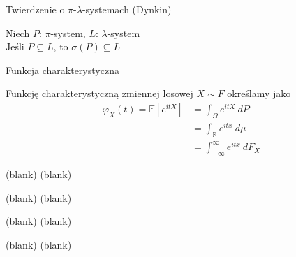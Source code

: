 \documentclass[avery5371,grid,frame]{flashcards}
\begin{document}
\begin{flashcard}[Twierdzenie]{Twierdzenie o $\pi$-$\lambda$-systemach (Dynkin)}

\smallskip
Niech $\mathit{P}$: $\pi$-system, $\mathit{L}$: $\lambda$-system \\
Jeśli $\mathit{P} \subseteq \mathit{L}$, to $\sigma(\mathit{P}) \subseteq \mathit{L}$
\end{flashcard}

\begin{flashcard}[Definicja]{Funkcja charakterystyczna}

\smallskip
Funkcję charakterystyczną zmiennej losowej $X \sim F$ określamy jako
{\begin{align*}
\varphi_X(t) = \mathbb{E} \left[ e^{itX} \right] &= \int_{\Omega} e^{itX} \ dP \\
             &= \int_{\mathbb{R}} e^{itx} \ d \mu \\
             &= \int_{-\infty}^{\infty} e^{itx} \ dF_X 
\end{align*}}
\end{flashcard}

\begin{flashcard}[Twierdzenie]{(blank)}
(blank)
\end{flashcard}
\begin{flashcard}[Twierdzenie]{(blank)}
(blank)
\end{flashcard}
\begin{flashcard}[Twierdzenie]{(blank)}
(blank)
\end{flashcard}
\begin{flashcard}[Twierdzenie]{(blank)}
(blank)
\end{flashcard}
\end{document}
